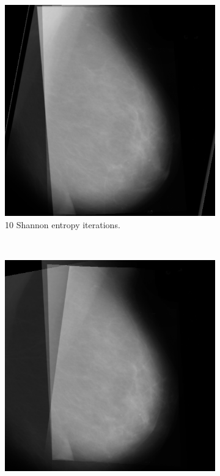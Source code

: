 \begin{figure}[H]
    \centering
    \begin{subfigure}[t]{0.3\textwidth}
        \includegraphics[width=\textwidth]{Chapter3/shannon-img/s-10-final.png}
        \caption{10 Shannon entropy iterations.}
        \label{fig:shannon-comp}
    \end{subfigure} \hfill
    ~ %
    \begin{subfigure}[t]{0.3\textwidth}
        \includegraphics[width=\textwidth]{Chapter3/nonProb-img/nonprob10.png}

\end{subfigure}
\end{figure}
